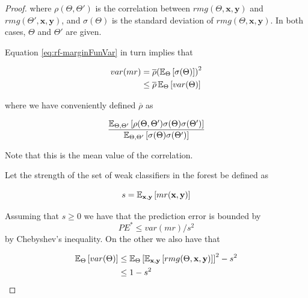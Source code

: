 \begin{proof}
	where $ \rho(\Theta, \Theta')$ is the correlation between $rmg(\Theta,\textbf{x},\textbf{y})$ and $rmg(\Theta',\textbf{x},\textbf{y})$, and $\sigma(\Theta)$ is the standard deviation of $rmg(\Theta,\textbf{x},\textbf{y})$. In both cases, $\Theta$ and $\Theta'$ are given.%

	Equation \cref{eq:rf-marginFunVar} in turn implies that

	\begin{equation}\label{eq:rf-varianceBound}
            \begin{split}
            var(mr) & = \overline{\rho} {(\operatorname{\mathbb{E}}_{\Theta}\left[ \sigma(\Theta)\right] )}^2 \\
            & \leq \overline{\rho} \operatorname{\mathbb{E}}_{\Theta} \left[ var(\Theta) \right]
            \end{split}
            \end{equation}

	where we have conveniently defined $\overline{\rho}$ as

	\begin{equation}\label{eq:rf-meanCorrelation}
            \frac{\operatorname{\mathbb{E}}_{\Theta, \Theta'} \left[ \rho(\Theta, \Theta') \sigma(\Theta) \sigma(\Theta')\right]}
            {\operatorname{\mathbb{E}}_{\Theta, \Theta'} \left[ \sigma(\Theta) \sigma(\Theta')\right]}
            \end{equation}

	Note that this is the mean value of the correlation.

	Let the strength of the set of weak classifiers in the forest be defined as

            \begin{equation}\label{eq:rf-strength}
            s = \operatorname{\mathbb{E}}_{\textbf{x},\textbf{y}} \left[ mr(\textbf{x},\textbf{y} ) \right]
            \end{equation}

	Assuming that $s \geq 0$ we have that the prediction error is bounded by
            \begin{equation}\label{eq:rf-predictiveErrorBound1}
            PE^* \leq var(mr)/s^2
            \end{equation}
	by Chebyshev's inequality. On the other we also have that

            \begin{equation}\label{eq:rf-expectedVarBound}
            \begin{split}
            \operatorname{\mathbb{E}}_{\Theta} \left[ var(\Theta) \right] & \leq \operatorname{\mathbb{E}}_{\Theta} {\left[ \operatorname{\mathbb{E}}_{\textbf{x},\textbf{y}}\left[ rmg(\Theta,\textbf{x},\textbf{y})  \right] \right]}^2 -s^2 \\
            & \leq 1-s^2
            \end{split}
            \end{equation}




\end{proof}
